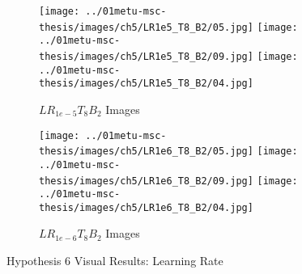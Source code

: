 \begin{figure}[htbp]
\begin{subfigure}[b]{\textwidth}
    \end{subfigure}
    \vspace{0.01cm}
    \begin{subfigure}[b]{\textwidth}
        \texttt{[image: ../01metu-msc-thesis/images/ch5/LR1e5\_T8\_B2/05.jpg]}
        \texttt{[image: ../01metu-msc-thesis/images/ch5/LR1e5\_T8\_B2/09.jpg]}
        \texttt{[image: ../01metu-msc-thesis/images/ch5/LR1e5\_T8\_B2/04.jpg]}
        \caption{$LR_{1e-5}T_{8}B_{2}$ Images}
    \end{subfigure}
    \vspace{0.01cm}
    \begin{subfigure}[b]{\textwidth}
        \texttt{[image: ../01metu-msc-thesis/images/ch5/LR1e6\_T8\_B2/05.jpg]}
        \texttt{[image: ../01metu-msc-thesis/images/ch5/LR1e6\_T8\_B2/09.jpg]}
        \texttt{[image: ../01metu-msc-thesis/images/ch5/LR1e6\_T8\_B2/04.jpg]}
        \caption{$LR_{1e-6}T_{8}B_{2}$ Images}
    \end{subfigure}
    \vspace{0.01cm}
    \caption{Hypothesis 6 Visual Results: Learning Rate }
    \label{fig:ch5:met82}
\end{figure}

